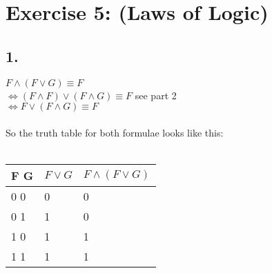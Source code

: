 \documentclass[12pt]{article}
\begin{document}
 

\rhead{\today}


\section*{Exercise 5:  (Laws of Logic)}

\subsection*{1.}
$F \land (F \lor G) \equiv F$\\
$\Leftrightarrow (F \land F) \lor (F \land G) \equiv F$ \hspace*{2cm} see part 2\\
$\Leftrightarrow F \lor (F \land G) \equiv F$\\\\
So the truth table for both formulae looks like this:\\\\
\begin{tabular}{  l | l | l }
	F G & $F \lor G$ & $F \land (F \lor G) $  \\ \hline
	0 0 & 0 & 0  \\
	0 1 & 1 & 0  \\
	1 0 & 1 & 1  \\
	1 1 & 1 & 1  \\
\end{tabular}
\end{document}
